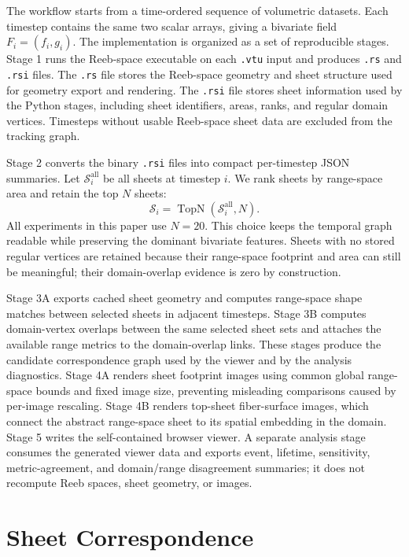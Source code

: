 \documentclass{vgtc}
\newcommand{\Sheets}{\mathcal{S}}
\begin{document}
The workflow starts from a time-ordered sequence of volumetric datasets. Each timestep contains the same two scalar arrays, giving a bivariate field $F_i=(f_i,g_i)$. The implementation is organized as a set of reproducible stages. Stage 1 runs the Reeb-space executable on each \texttt{.vtu} input and produces \texttt{.rs} and \texttt{.rsi} files. The \texttt{.rs} file stores the Reeb-space geometry and sheet structure used for geometry export and rendering. The \texttt{.rsi} file stores sheet information used by the Python stages, including sheet identifiers, areas, ranks, and regular domain vertices. Timesteps without usable Reeb-space sheet data are excluded from the tracking graph.

Stage 2 converts the binary \texttt{.rsi} files into compact per-timestep JSON summaries. Let $\Sheets_i^\mathrm{all}$ be all sheets at timestep $i$. We rank sheets by range-space area and retain the top $N$ sheets:
$$
\Sheets_i = \operatorname{TopN}(\Sheets_i^\mathrm{all}, N).
$$
All experiments in this paper use $N=20$. This choice keeps the temporal graph readable while preserving the dominant bivariate features. Sheets with no stored regular vertices are retained because their range-space footprint and area can still be meaningful; their domain-overlap evidence is zero by construction.

Stage 3A exports cached sheet geometry and computes range-space shape matches between selected sheets in adjacent timesteps. Stage 3B computes domain-vertex overlaps between the same selected sheet sets and attaches the available range metrics to the domain-overlap links. These stages produce the candidate correspondence graph used by the viewer and by the analysis diagnostics. Stage 4A renders sheet footprint images using common global range-space bounds and fixed image size, preventing misleading comparisons caused by per-image rescaling. Stage 4B renders top-sheet fiber-surface images, which connect the abstract range-space sheet to its spatial embedding in the domain. Stage 5 writes the self-contained browser viewer. A separate analysis stage consumes the generated viewer data and exports event, lifetime, sensitivity, metric-agreement, and domain/range disagreement summaries; it does not recompute Reeb spaces, sheet geometry, or images.

\section{Sheet Correspondence}
\end{document}

